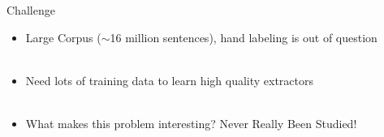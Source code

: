 \documentclass{beamer}
\begin{document}
\begin{frame}{Challenge}
 \begin{itemize}
  \item Large Corpus ($\sim$16 million sentences), hand labeling is out of question \pause \\~\\
  \item Need lots of training data to learn high quality extractors \pause \\~\\
  \item What makes this problem interesting? Never Really Been Studied!
 \end{itemize}
\end{frame}



%   





\end{document}
